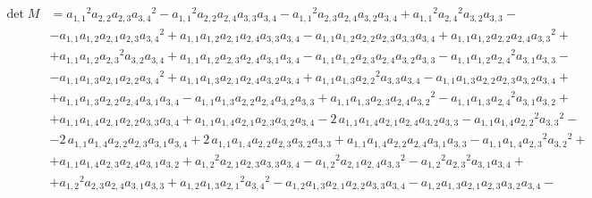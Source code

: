 \begin{equation}\label{eq:determenant}
\begin{aligned}
\det{M} &= {a_{{1,1}}}^{2}a_{{2,2}}a_{{2,3}}{a_{{3,4}}}^{2} - {a_{{1,1}}}^{2}a_{{2,2}}a_{{2,4}}a_{{3,3}}a_{{3,4}} - {a_{{1,1}}}^{2}a_{{2,3}}a_{{2,4}}a_{{3,2}}a_{{3,4}} + {a_{{1,1}}}^{2}{a_{{2,4}}}^{2}a_{{3,2}}a_{{3,3}} -\\
        &-a_{{1,1}}a_{{1,2}}a_{{2,1}}a_{{2,3}}{a_{{3,4}}}^{2} + a_{{1,1}}a_{{1,2}}a_{{2,1}}a_{{2,4}}a_{{3,3}}a_{{3,4}} - a_{{1,1}}a_{{1,2}}a_{{2,2}}a_{{2,3}}a_{{3,3}}a_{{3,4}} + a_{{1,1}}a_{{1,2}}a_{{2,2}}a_{{2,4}}{a_{{3,3}}}^{2} +\\ 
        &+ a_{{1,1}}a_{{1,2}}{a_{{2,3}}}^{2}a_{{3,2}}a_{{3,4}} + a_{{1,1}}a_{{1,2}}a_{{2,3}}a_{{2,4}}a_{{3,1}}a_{{3,4}} - a_{{1,1}}a_{{1,2}}a_{{2,3}}a_{{2,4}}a_{{3,2}}a_{{3,3}} - a_{{1,1}}a_{{1,2}}{a_{{2,4}}}^{2}a_{{3,1}}a_{{3,3}} -\\ 
        &- a_{{1,1}}a_{{1,3}}a_{{2,1}}a_{{2,2}}{a_{{3,4}}}^{2} + a_{{1,1}}a_{{1,3}}a_{{2,1}}a_{{2,4}}a_{{3,2}}a_{{3,4}} + a_{{1,1}}a_{{1,3}}{a_{{2,2}}}^{2}a_{{3,3}}a_{{3,4}} - a_{{1,1}}a_{{1,3}}a_{{2,2}}a_{{2,3}}a_{{3,2}}a_{{3,4}} +\\
        &+ a_{{1,1}}a_{{1,3}}a_{{2,2}}a_{{2,4}}a_{{3,1}}a_{{3,4}} - a_{{1,1}}a_{{1,3}}a_{{2,2}}a_{{2,4}}a_{{3,2}}a_{{3,3}} + a_{{1,1}}a_{{1,3}}a_{{2,3}}a_{{2,4}}{a_{{3,2}}}^{2} - a_{{1,1}}a_{{1,3}}{a_{{2,4}}}^{2}a_{{3,1}}a_{{3,2}} +\\
        &+ a_{{1,1}}a_{{1,4}}a_{{2,1}}a_{{2,2}}a_{{3,3}}a_{{3,4}} + a_{{1,1}}a_{{1,4}}a_{{2,1}}a_{{2,3}}a_{{3,2}}a_{{3,4}} - 2\,a_{{1,1}}a_{{1,4}}a_{{2,1}}a_{{2,4}}a_{{3,2}}a_{{3,3}} - a_{{1,1}}a_{{1,4}}{a_{{2,2}}}^{2}{a_{{3,3}}}^{2} -\\
        &- 2\,a_{{1,1}}a_{{1,4}}a_{{2,2}}a_{{2,3}}a_{{3,1}}a_{{3,4}} + 2\,a_{{1,1}}a_{{1,4}}a_{{2,2}}a_{{2,3}}a_{{3,2}}a_{{3,3}} + a_{{1,1}}a_{{1,4}}a_{{2,2}}a_{{2,4}}a_{{3,1}}a_{{3,3}} - a_{{1,1}}a_{{1,4}}{a_{{2,3}}}^{2}{a_{{3,2}}}^{2} + \\ 
        &+ a_{{1,1}}a_{{1,4}}a_{{2,3}}a_{{2,4}}a_{{3,1}}a_{{3,2}} + {a_{{1,2}}}^{2}a_{{2,1}}a_{{2,3}}a_{{3,3}}a_{{3,4}} - {a_{{1,2}}}^{2}a_{{2,1}}a_{{2,4}}{a_{{3,3}}}^{2} - {a_{{1,2}}}^{2}{a_{{2,3}}}^{2}a_{{3,1}}a_{{3,4}} + \\ 
        &+ {a_{{1,2}}}^{2}a_{{2,3}}a_{{2,4}}a_{{3,1}}a_{{3,3}} + a_{{1,2}}a_{{1,3}}{a_{{2,1}}}^{2}{a_{{3,4}}}^{2} - a_{{1,2}}a_{{1,3}}a_{{2,1}}a_{{2,2}}a_{{3,3}}a_{{3,4}} - a_{{1,2}}a_{{1,3}}a_{{2,1}}a_{{2,3}}a_{{3,2}}a_{{3,4}} - \\ 

\end{aligned}
\end{equation}
